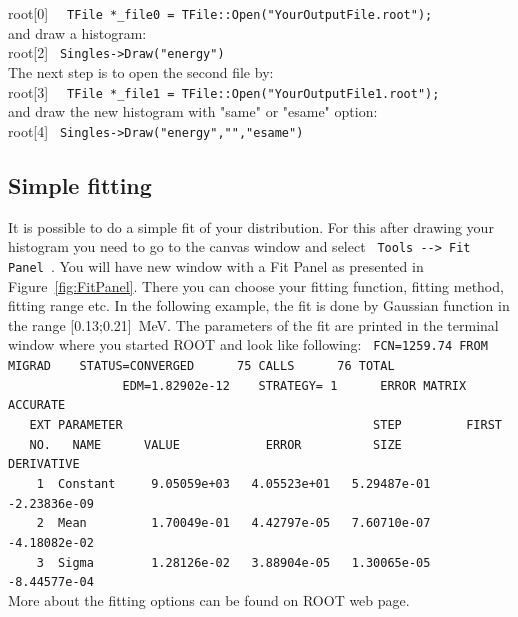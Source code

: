 \documentclass[12pt]{article}
\begin{document}
root[0] \verb|  TFile *_file0 = TFile::Open("YourOutputFile.root");|\\

and draw a histogram:\\

root[2] \verb| Singles->Draw("energy") | \\

The next step is to open the second file by: \\

root[3] \verb|  TFile *_file1 = TFile::Open("YourOutputFile1.root");|\\

and draw the new histogram with "same" or "esame" option:\\

root[4] \verb| Singles->Draw("energy","","esame") |\\


\subsection{Simple fitting}
It is possible to do a simple fit of your distribution. For this after drawing your histogram you need to go to the canvas window and select \verb| Tools --> Fit Panel |. You will have new window with a Fit Panel as presented in Figure~\ref{fig:FitPanel}. There you can choose your fitting function, fitting method, fitting range etc. In the following example, the fit is done by Gaussian function in the range [0.13;0.21]~MeV. The parameters of the fit are printed in the terminal window where you started ROOT and look like following:
\verb| FCN=1259.74 FROM MIGRAD    STATUS=CONVERGED      75 CALLS      76 TOTAL|\\
\verb|                EDM=1.82902e-12    STRATEGY= 1      ERROR MATRIX ACCURATE| \\
\verb|   EXT PARAMETER                                   STEP         FIRST|   \\
\verb|   NO.   NAME      VALUE            ERROR          SIZE      DERIVATIVE |\\
\verb|    1  Constant     9.05059e+03   4.05523e+01   5.29487e-01  -2.23836e-09 |\\
\verb|    2  Mean         1.70049e-01   4.42797e-05   7.60710e-07  -4.18082e-02|\\
\verb|    3  Sigma        1.28126e-02   3.88904e-05   1.30065e-05  -8.44577e-04|\\

More about the fitting options can be found on ROOT web page.
\end{document}

